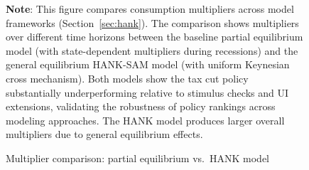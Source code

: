 \documentclass{econsocart}
\begin{document}
\begin{figure}[htb] 
  \centering
  \caption{\pregenmark Multiplier comparison: partial equilibrium vs.\ HANK model}
  \label{fig:HANK_multipliers} %

  \medskip
  \noindent\parbox{\textwidth}{\footnotesize
    \textbf{Note}: This figure compares consumption multipliers across model frameworks (Section~\ref{sec:hank}).
    The comparison shows multipliers over different time horizons
    between the baseline partial equilibrium model (with state-dependent multipliers during recessions)
    and the general equilibrium HANK-SAM model (with uniform Keynesian cross mechanism).
    Both models show the tax cut policy substantially underperforming relative to stimulus checks
    and UI extensions, validating the robustness of policy rankings across modeling approaches.
    The HANK model produces larger overall multipliers due to general equilibrium effects.
  }
\end{figure}

\vspace{0.5em}
\end{document}
